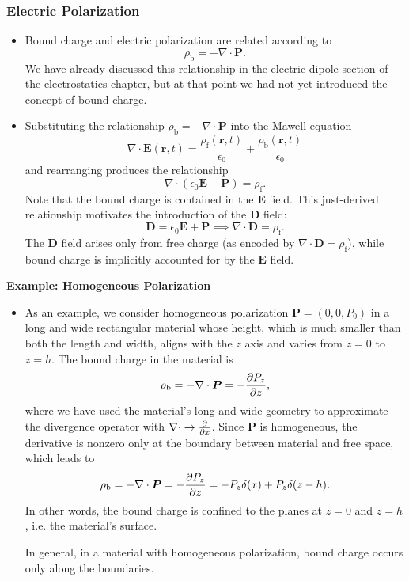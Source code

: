 \documentclass[11pt, a4paper]{article}
\renewcommand{\vec}[1]{\bm{#1}} %
\renewcommand{\r}{\vec{r}}
\newcommand{\E}{\vec{E}} %
\newcommand{\D}{\vec{D}}  %
\renewcommand{\P}{\vec{P}}  %
\newcommand{\ee}{\epsilon_{0}}  %
\renewcommand{\div}{\nabla \cdot}
\begin{document}
\subsubsection{Electric Polarization}
\begin{itemize}
	\item Bound charge and electric polarization are related according to
	\begin{equation*}
		\rho_{\text{b}} = - \div \P.
	\end{equation*}
    We have already discussed this relationship in the electric dipole section of the electrostatics chapter, but at that point we had not yet introduced the concept of bound charge.
	
	\item Substituting the relationship $ \rho_{\text{b}} = - \div \P $ into the Mawell equation
    \begin{equation*}
		\div \E (\r, t) = \frac{\rho_{\text{f}}(\r, t)}{\ee} + \frac{\rho_{\text{b}}(\r, t)}{\ee}
    \end{equation*}
    and rearranging produces the relationship
	\begin{equation*}
		\div (\ee \E + \P) = \rho_{\text{f}}.
	\end{equation*}
	Note that the bound charge is contained in the $ \E $ field. This just-derived relationship motivates the introduction of the $ \D $ field:
	\begin{equation*}
		\D = \ee \E + \P \implies \div \D = \rho_{\text{f}}.
	\end{equation*}
    The $ \D $ field arises only from free charge (as encoded by $ \div \D = \rho_{\text{f}} $), while bound charge is implicitly accounted for by the $ \E $ field.

\end{itemize}
	
\textbf{Example: Homogeneous Polarization}
\begin{itemize}
	\item As an example, we consider homogeneous polarization $ \P = (0, 0, P_{0}) $ in a long and wide rectangular material whose height, which is much smaller than both the length and width, aligns with the $ z $ axis and varies from $ z = 0 $ to $ z = h $. The bound charge in the material is
	\begin{equation*}
		\rho_{\text{b}} = - \div \P = - \pdv{P_{z}}{z},
	\end{equation*}
    where we have used the material's long and wide geometry to approximate the divergence operator with $ \div \to \pdv{x} $. Since $ \P $ is homogeneous, the derivative is nonzero only at the boundary between material and free space, which leads to
	\begin{equation*}
		\rho_{\text{b}} = - \div \P = - \pdv{P_{z}}{z} = - P_{z}\delta(x) + P_{z}\delta(z - h).
	\end{equation*}
	In other words, the bound charge is confined to the planes at $ z = 0 $ and $ z = h $, i.e. the material's surface. 

    In general, in a material with homogeneous polarization, bound charge occurs only along the boundaries.
\end{itemize}
\end{document}

